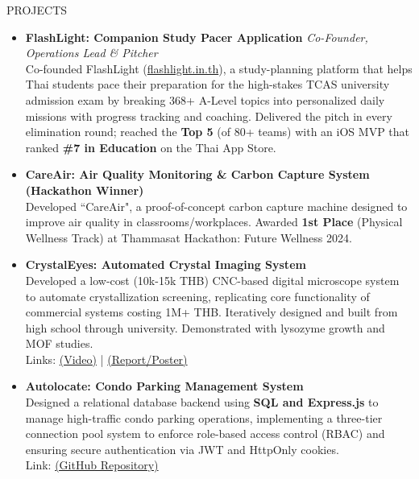 \documentclass[11pt]{resume} %
\begin{document}
\begin{rSection}{PROJECTS}
    \begin{itemize}[leftmargin=*]
        \item \textbf{FlashLight: Companion Study Pacer Application} \hfill \textit{Co-Founder, Operations Lead \& Pitcher} \\
        Co-founded FlashLight (\href{https://flashlight.in.th}{flashlight.in.th}), a study-planning platform that helps Thai students pace their preparation for the high-stakes TCAS university admission exam by breaking 368+ A-Level topics into personalized daily missions with progress tracking and coaching. Delivered the pitch in every elimination round; reached the \textbf{Top 5} (of 80+ teams) with an iOS MVP that ranked \textbf{\#7 in Education} on the Thai App Store.

        \item \textbf{CareAir: Air Quality Monitoring \& Carbon Capture System (Hackathon Winner)} \\
        Developed ``CareAir", a proof-of-concept carbon capture machine designed to improve air quality in
        classrooms\slash workplaces. Awarded \textbf{1st Place} (Physical Wellness Track) at Thammasat Hackathon:
        Future Wellness 2024.

        \item \textbf{CrystalEyes: Automated Crystal Imaging System} \\
        Developed a low-cost (10k-15k THB) CNC-based digital microscope system to automate crystallization screening,
        replicating core functionality of commercial systems costing 1M+ THB. Iteratively designed and built from high school
        through university. Demonstrated with lysozyme growth and MOF studies. \\ Links: \href{https://youtu.be/uhPnnxGZzjI}{(Video)} | \href{https://drive.google.com/drive/folders/1st1oj2_nghs2p9U-4JLflPOut1JF-Zu-?usp=sharing}{(Report/Poster)}

        \item \textbf{Autolocate: Condo Parking Management System} \\
        Designed a relational database backend using \textbf{SQL and Express.js} to manage high-traffic condo parking operations,
        implementing a three-tier connection pool system to enforce role-based access control (RBAC) and ensuring secure
        authentication via JWT and HttpOnly cookies. \\ Link: \href{https://github.com/Warit-Yuv/Autolocate_Backend}{(GitHub Repository)}


\end{itemize}
\end{rSection}
\end{document}
